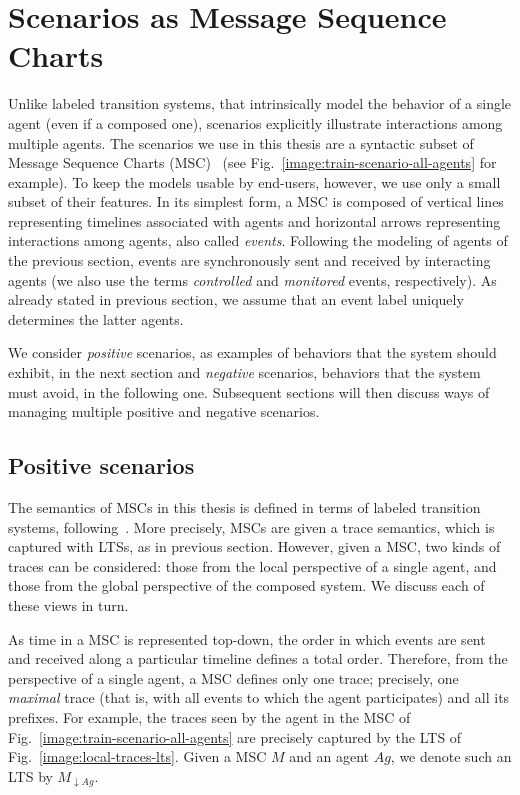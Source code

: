 \section{Scenarios as Message Sequence Charts}

Unlike labeled transition systems, that intrinsically model the behavior of a single agent (even if a composed one), scenarios explicitly illustrate interactions among multiple agents. The scenarios we use in this thesis are a syntactic subset of Message Sequence Charts (MSC)~\cite{ITU:1996} (see Fig.~\ref{image:train-scenario-all-agents} for example). To keep the models usable by end-users, however, we use only a small subset of their features. In its simplest form, a MSC is composed of vertical lines representing timelines associated with agents and horizontal arrows representing interactions among agents, also called \emph{events}. Following the modeling of agents of the previous section, events are synchronously sent and received by interacting agents (we also use the terms \emph{controlled} and \emph{monitored} events, respectively). As already stated in previous section, we assume that an event label uniquely determines the latter agents. 

We consider \emph{positive} scenarios, as examples of behaviors that the system should exhibit, in the next section and \emph{negative} scenarios, behaviors that the system must avoid, in the following one. Subsequent sections will then discuss ways of managing multiple positive and negative scenarios. 

\subsection{Positive scenarios\label{subsection:background-positive-scenarios}}

The semantics of MSCs in this thesis is defined in terms of labeled transition systems, following~\cite{Uchitel:2003}. More precisely, MSCs are given a trace semantics, which is captured with LTSs, as in previous section. However, given a MSC, two kinds of traces can be considered: those from the local perspective of a single agent, and those from the global perspective of the composed system. We discuss each of these views in turn.

As time in a MSC is represented top-down, the order in which events are sent and received along a particular timeline defines a total order. Therefore, from the perspective of a single agent, a MSC defines only one trace; precisely, one \emph{maximal} trace (that is, with all events to which the agent participates) and all its prefixes. For example, the traces seen by the  agent in the MSC of Fig.~\ref{image:train-scenario-all-agents} are precisely captured by the LTS of Fig.~\ref{image:local-traces-lts}. Given a MSC $M$ and an agent $Ag$, we denote such an LTS by $M_{\downarrow Ag}$.

